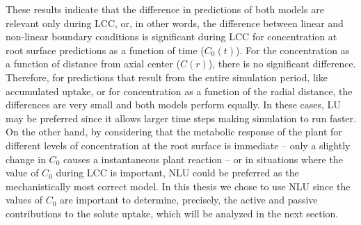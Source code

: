 {\tblue These results indicate that the difference in predictions of both models are relevant only during LCC,
or, in other words, the difference between linear and non-linear boundary conditions is significant during LCC for concentration at root surface predictions as a function of time ($C_0(t)$).
For the concentration as a function of distance from axial center ($C(r)$), there is no significant difference.
}
Therefore, for predictions that result from the entire simulation period, like accumulated uptake, or for concentration as a function of the radial distance, the differences are very small and both models perform equally. 
In these cases, LU may be preferred since it allows larger time steps making simulation to run faster.
On the other hand, by considering that the metabolic response of the plant for different levels of concentration at the root surface is immediate -- only a slightly change in $C_0$ causes a instantaneous plant reaction -- or in situations where the value of $C_0$ during LCC is important, NLU could be preferred as the mechanistically most correct model.  
In this thesis we chose to use NLU since the values of $C_0$ are important to determine, precisely, the active and passive contributions to the solute uptake, which will be analyzed in the next section.


